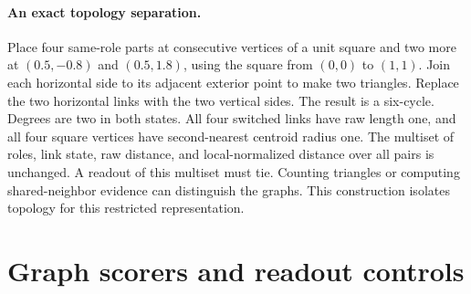 \documentclass[10pt,twocolumn,letterpaper]{article}
\begin{document}
\begin{table}[t]
\centering
\caption{\textbf{Coverage, balance, and sensitivity to matching.} D/F/E gives donors, fields or scans, and edits. Raw and local columns give the median and maximum multiplicative imbalance under the \emph{same} correspondence. The original length criterion uses separately sorted raw lengths, so its maximum under the common correspondence can exceed 1.35. Roles counts exact role-pair matches. Gains are against typed centroid distance. Rank minus response compares the GNN's edited-state loss AUROC with its matched absolute probability-change AUROC. Paired intervals are in points.}
\label{tab:balance}
\scriptsize
\setlength{\tabcolsep}{3.5pt}

\end{table}

\paragraph{An exact topology separation.}
Place four same-role parts at consecutive vertices of a unit square and two more at $(0.5,-0.8)$ and $(0.5,1.8)$, using the square from $(0,0)$ to $(1,1)$. Join each horizontal side to its adjacent exterior point to make two triangles. Replace the two horizontal links with the two vertical sides. The result is a six-cycle. Degrees are two in both states. All four switched links have raw length one, and all four square vertices have second-nearest centroid radius one. The multiset of roles, link state, raw distance, and local-normalized distance over all pairs is unchanged. A readout of this multiset must tie. Counting triangles or computing shared-neighbor evidence can distinguish the graphs. This construction isolates topology for this restricted representation.

\begin{table}[t]
\centering
\caption{\textbf{Graph ranking and response results.} Source and Edited rank targets by the observed-state anomaly score (geometry uses its fixed readout). Response ranks absolute change in conditional probability or change in the geometry readout. The edited intervals are donor paired. GlaS and HVSMR use 78 and 59 source graphs in the original length tier. The pair MLP and frozen GNN controls keep conditional probability fixed.}
\label{tab:previous_graph}
\scriptsize
\setlength{\tabcolsep}{3.5pt}

\end{table}

\section{Graph scorers and readout controls}
\end{document}
